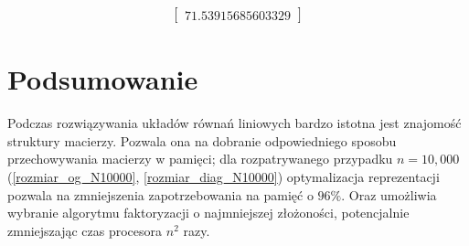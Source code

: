\documentclass[11pt]{extarticle}
\begin{document}
\begin{align}
\begin{bmatrix}
			71.53915685603329
		\end{bmatrix}
	\end{align}
	
	\pagebreak
	\section{Podsumowanie}

	Podczas rozwiązywania układów równań liniowych bardzo istotna jest znajomość struktury macierzy.
	Pozwala ona na dobranie odpowiedniego sposobu przechowywania macierzy w pamięci;
	dla rozpatrywanego przypadku \(n=10,000\) (\ref{rozmiar_og_N10000}, \ref{rozmiar_diag_N10000})
	optymalizacja reprezentacji pozwala na zmniejszenia zapotrzebowania na pamięć o \(96\%\).
	Oraz umożliwia wybranie algorytmu faktoryzacji o najmniejszej złożoności,
	potencjalnie zmniejszając czas procesora \(n^2\) razy.
\end{document}
